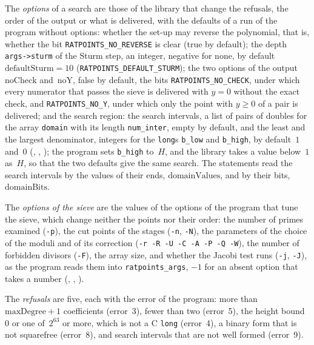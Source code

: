 \begin{definition}\label{def:Options}
  \leanok
  The \emph{options} of a search are those of the library that change the refusals, the order of the
  output or what is delivered, with the defaults of a run of the program without options: whether
  the set-up may reverse the polynomial, that is, whether the bit \verb|RATPOINTS_NO_REVERSE| is
  clear (true by default); the depth \verb|args->sturm| of the Sturm step, an integer, negative for
  none, by default $\mathrm{defaultSturm} = 10$ (\verb|RATPOINTS_DEFAULT_STURM|); the two options of
  the output $\mathrm{noCheck}$ and~$\mathrm{noY}$, false by default, the bits
  \verb|RATPOINTS_NO_CHECK|, under which every numerator that passes the sieve is delivered with
  $y = 0$ without the exact check, and \verb|RATPOINTS_NO_Y|, under which only the point with
  $y \ge 0$ of a pair is delivered; and the search region: the search intervals, a list of pairs of
  doubles for the array \verb|domain| with its length \verb|num_inter|, empty by default, and the
  least and the largest denominator, integers for the \verb|long|s \verb|b_low| and \verb|b_high|,
  by default~$1$ and~$0$ (, ,
  ); the program sets \verb|b_high| to~$H$, and the library takes a
  value below~$1$ as~$H$, so that the two defaults give the same search. The statements read the
  search intervals by the values of their ends, $\mathrm{domainValues}$, and by their bits,
  $\mathrm{domainBits}$.

  The \emph{options of the sieve} are the values of the options of the program that tune the sieve,
  which change neither the points nor their order: the number of primes examined (\verb|-p|), the
  cut points of the stages (\verb|-n|, \verb|-N|), the parameters of the choice of the moduli and of
  its correction (\verb|-r -R -U -C -A -P -Q -W|), the number of forbidden divisors (\verb|-F|), the
  array size, and whether the Jacobi test runs (\verb|-j|, \verb|-J|), as the program reads them
  into \verb|ratpoints_args|, $-1$ for an absent option that takes a number
  (, , ).

  The \emph{refusals} are five, each with the error of the program: more than
  $\mathrm{maxDegree} + 1$ coefficients (error~3), fewer than two (error~5), the height bound~$0$ or
  one of~$2^{63}$ or more, which is not a C \verb|long| (error~4), a binary form that is not
  squarefree (error~8), and search intervals that are not well formed (error~9).


\end{definition}
